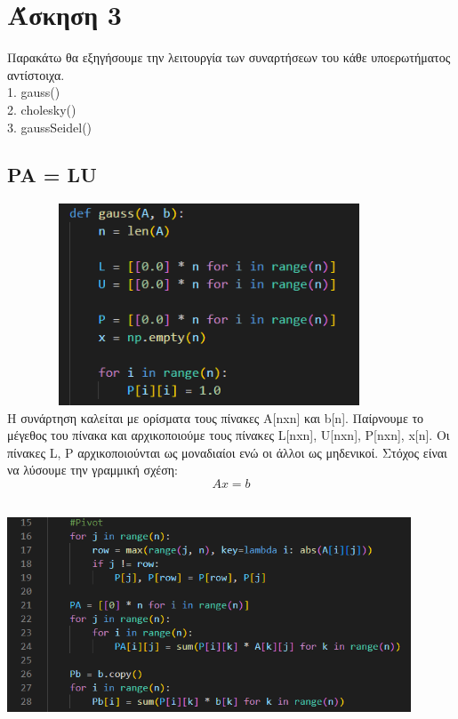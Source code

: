 \documentclass[a4paper,11pt]{article}
\newcommand{\lt}{\latintext}
\newcommand{\gt}{\greektext}
\begin{document}
\vspace*{3 cm}
\section{Άσκηση 3}
	\normalsize{Παρακάτω θα εξηγήσουμε την λειτουργία των συναρτήσεων
του κάθε υποερωτήματος αντίστοιχα.
\lt \\ 1. gauss() \\ 2. cholesky() \\ 3. gaussSeidel()}

	\subsection{\lt PA = LU}
\includegraphics[height=6cm, width=12cm]{initialization.png}
\\
\normalsize{Η συνάρτηση καλείται με ορίσματα τους πίνακες \lt
A[nxn] \gt και \lt b[n]. \gt Παίρνουμε το μέγεθος του πίνακα και
αρχικοποιούμε τους πίνακες \lt L[nxn], U[nxn], P[nxn], x[n].  \gt
Οι πίνακες \lt L, P \gt αρχικοποιούνται ως μοναδιαίοι ενώ οι άλλοι ως
μηδενικοί. Στόχος είναι να λύσουμε την γραμμική σχέση:}
\\
\begin{equation*}
	Ax = b
\end{equation*}
\\
\includegraphics[height=6.5cm, width=12cm]{pivot.png}
\end{document}

